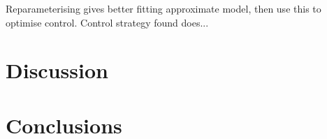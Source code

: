 Reparameterising gives better fitting approximate model, then use this to optimise control. Control strategy found does...

\begin{figure}
    \begin{center}
        \caption[Globally optimal strategy]{\label{fig:ch5:global_optimal}}
    \end{center}
\end{figure}

\section{Discussion\label{sec:ch5:discussion}}

\section{Conclusions\label{sec:ch5:conclusions}}